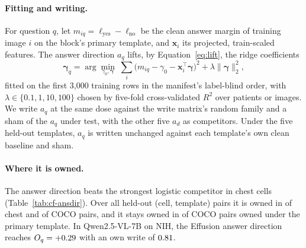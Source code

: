 \documentclass{article}
\begin{document}
\paragraph{Fitting and writing.} For question $q$, let $m_{iq}=\ell_{\mathrm{yes}}-\ell_{\mathrm{no}}$ be the clean answer margin of training image $i$ on the block's primary template, and $\boldsymbol x_i$ its projected, train-scaled features. The answer direction $a_q$ lifts, by Equation~\ref{eq:lift}, the ridge coefficients
\begin{equation}
\boldsymbol\gamma_q=\arg\min_{\gamma_0,\boldsymbol\gamma}\;\sum_{i}\bigl(m_{iq}-\gamma_0-\boldsymbol x_i^{\top}\boldsymbol\gamma\bigr)^2+\lambda\lVert\boldsymbol\gamma\rVert_2^2 ,
\label{eq:answer-direction}
\end{equation}
fitted on the first 3{,}000 training rows in the manifest's label-blind order, with $\lambda\in\{0.1,1,10,100\}$ chosen by five-fold cross-validated $R^2$ over patients or images. We write $a_q$ at the same dose against the write matrix's random family and a sham of the $a_q$ under test, with the other five $a_d$ as competitors. Under the five held-out templates, $a_q$ is written unchanged against each template's own clean baseline and sham.

\paragraph{Where it is owned.} The answer direction beats the strongest logistic competitor in \cfAnsChestBeats{} chest cells (Table~\ref{tab:cf-ansdir}). Over all held-out (cell, template) pairs it is owned in \cfAnsdirtChestOwnedPairs{} of \cfAnsdirtChestPairsAll{} chest and \cfAnsdirtCocoOwnedPairs{} of \cfAnsdirtCocoPairsAll{} COCO pairs, and it stays owned in \cfAnsdirtCocoKept{} of \cfAnsdirtCocoKeptN{} COCO pairs owned under the primary template. In Qwen2.5-VL-7B on NIH, the Effusion answer direction reaches $O_q=+0.29$ with an own write of $0.81$.
\end{document}

